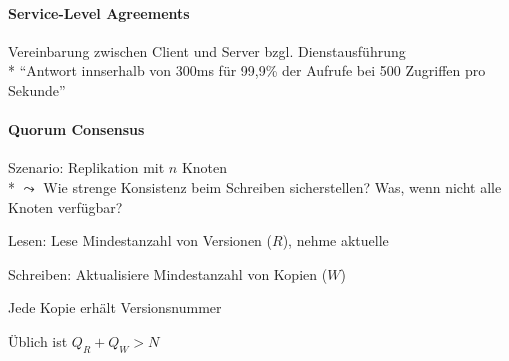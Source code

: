 \paragraph{Service-Level Agreements}
\begin{items}
	\item Vereinbarung zwischen Client und Server bzgl. Dienstausführung
		\\*
		``Antwort innserhalb von 300ms für 99,9\% der Aufrufe bei 500 Zugriffen pro Sekunde''
\end{items}

\paragraph{Quorum Consensus}
\begin{items}
	\item Szenario: Replikation mit \( n \) Knoten
		\\*
		\( \leadsto \) Wie strenge Konsistenz beim Schreiben sicherstellen? Was, wenn nicht alle Knoten verfügbar?
	\item Lesen: Lese Mindestanzahl von Versionen (\( R \)), nehme aktuelle
	\item Schreiben: Aktualisiere Mindestanzahl von Kopien (\( W \))
	\item Jede Kopie erhält Versionsnummer
	\item Üblich ist \( Q_R+Q_W > N \)
\end{items}



